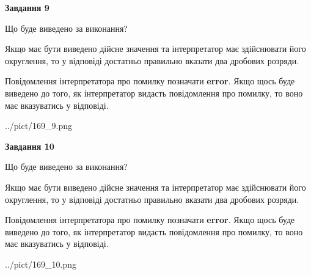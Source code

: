 \documentclass[12pt, ukrainian]{article}
\begin{document}
{\begin {Large}
{\begin {center}\textbf{Завдання 9}\end {center}}\par
Що буде виведено за виконання? \par

Якщо має бути виведено дійсне значення та інтерпретатор має здійснювати його округлення, 
то у відповіді достатньо правильно вказати два дробових розряди.

Повідомлення інтерпретатора про помилку позначати \textbf{error}.
Якщо щось буде виведено до того, як інтерпретатор видасть повідомлення про помилку, 
то воно має вказуватись у відповіді. \par

\begin{center}
	{../pict/169_9.png}
\end{center}
\newpage

{\begin {center}\textbf{Завдання 10}\end {center}}\par
Що буде виведено за виконання? \par

Якщо має бути виведено дійсне значення та інтерпретатор має здійснювати його округлення, 
то у відповіді достатньо правильно вказати два дробових розряди.

Повідомлення інтерпретатора про помилку позначати \textbf{error}.
Якщо щось буде виведено до того, як інтерпретатор видасть повідомлення про помилку, 
то воно має вказуватись у відповіді. \par

\begin{center}
	{../pict/169_10.png}
\end{center}
\newpage

\end {Large}}
\end{document}
